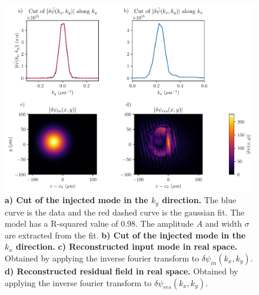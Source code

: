 \begin{figure}
    \centering
    \includegraphics[width=1\textwidth]{chap_stimulated_hawking/fig/fit_input_mode.pdf}
    \caption{\textbf{a) Cut of the injected mode in the $k_y$ direction.} The blue curve is the data and the red dashed curve is the gaussian fit. The model has a R-squared value of 0.98. The amplitude $A$ and width $\sigma$ are extracted from the fit. 
    \textbf{b) Cut of the injected mode in the $k_x$ direction.}
    \textbf{c) Reconstructed input mode in real space.} Obtained by applying the inverse fourier transform to $\delta \psi_{in}(k_x,k_y)$.
    \textbf{d) Reconstructed residual field in real space.} Obtained by applying the inverse fourier transform to $\delta \psi_{res}(k_x,k_y)$.}
    \label{fig:fit_input_mode}
\end{figure}